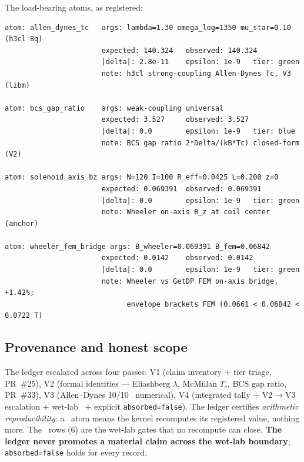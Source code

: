 The load-bearing atoms, as registered:
\begin{lstlisting}
atom: allen_dynes_tc   args: lambda=1.30 omega_log=1350 mu_star=0.10 (h3cl 8q)
                       expected: 140.324   observed: 140.324
                       |delta|: 2.8e-11    epsilon: 1e-9   tier: green
                       note: h3cl strong-coupling Allen-Dynes Tc, V3 (libm)

atom: bcs_gap_ratio    args: weak-coupling universal
                       expected: 3.527     observed: 3.527
                       |delta|: 0.0        epsilon: 1e-9   tier: blue
                       note: BCS gap ratio 2*Delta/(kB*Tc) closed-form (V2)

atom: solenoid_axis_bz args: N=120 I=100 R_eff=0.0425 L=0.200 z=0
                       expected: 0.069391  observed: 0.069391
                       |delta|: 0.0        epsilon: 1e-9   tier: green
                       note: Wheeler on-axis B_z at coil center (anchor)

atom: wheeler_fem_bridge args: B_wheeler=0.069391 B_fem=0.06842
                       expected: 0.0142    observed: 0.0142
                       |delta|: 0.0        epsilon: 1e-9   tier: green
                       note: Wheeler vs GetDP FEM on-axis bridge, +1.42%;
                             envelope brackets FEM (0.0661 < 0.06842 < 0.0722 T)
\end{lstlisting}

\subsection{Provenance and honest scope}
\label{app:verify-honest}

The ledger escalated across four passes: V1 (claim inventory + tier triage,
PR~\#25), V2 (formal identities --- Eliashberg $\lambda$, McMillan $T_c$,
BCS gap ratio, PR~\#33), V3 (Allen--Dynes 10/10 \tierGreen\ numerical), V4
(integrated tally + V2$\to$V3 escalation + wet-lab \tierOrange\ + explicit
\texttt{absorbed=false}). The ledger certifies \emph{arithmetic
reproducibility}: a \tierGreen\ atom means the kernel recomputes its
registered value, nothing more. The \tierOrange\ rows (6) are the wet-lab
gates that no recompute can close. \textbf{The ledger never promotes a
material claim across the wet-lab boundary}; \texttt{absorbed=false} holds
for every record.
